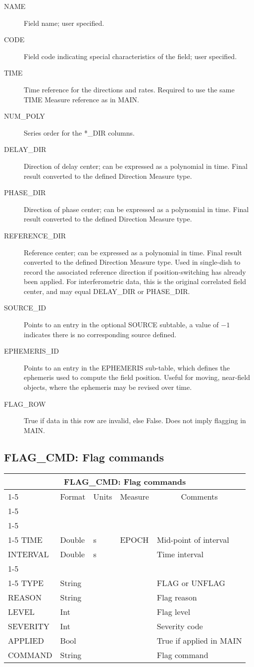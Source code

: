 \documentclass{article}
\newcommand{\defline}[1]{\cline{1-5}
\multicolumn{5}{|l|}{#1} \\
\cline{1-5}}
\newcommand{\definetable}[2]
{
	\vfill\newpage
	\subsection{#1}
        \vspace{0.15in}
        \small
	\begin{tabular}{|l|p{1.25in}|l|p{.9in}|p{1.4in}|}
	\hline
	\multicolumn{5}{|c|}{\bf #1}\\ 
	\cline{1-5}
        \multicolumn{1}{|c|}{Name}&\multicolumn{1}{|c|}{Format}&
        \multicolumn{1}{|c|}{Units}&\multicolumn{1}{|c|}{Measure}&
        \multicolumn{1}{|c|}{Comments}\\
        \cline{1-5}
        #2
        \hline
	\end{tabular}
}
\begin{document}
\begin{itemize}
\begin{description}
\item[NAME] Field name; user specified.

\item[CODE] Field code indicating special characteristics of the
field; user specified.

\item[TIME] Time reference for the directions and rates. Required to 
use the same TIME Measure reference as in MAIN.

\item[NUM\_POLY] Series order for the *\_DIR columns.

\item[DELAY\_DIR] Direction of delay center; can be expressed as a
polynomial in time. Final result converted to the defined Direction
Measure type.

\item[PHASE\_DIR] Direction of phase center; can be expressed as a
polynomial in time. Final result converted to the defined Direction
Measure type.

\item[REFERENCE\_DIR] Reference center; can be expressed as a
polynomial in time. Final result converted to the defined Direction
Measure type. Used in single-dish to record the associated reference
direction if position-switching has already been applied. For
interferometric data, this is the original correlated field center,
and may equal DELAY\_DIR or PHASE\_DIR.

\item[SOURCE\_ID] Points to an entry in the optional SOURCE subtable, a
value of $-1$ indicates there is no corresponding source defined.

\item[EPHEMERIS\_ID] Points to an entry in the EPHEMERIS sub-table,
which defines the ephemeris used to compute the field position. Useful
for moving, near-field objects, where the ephemeris may be revised over time.

\item[FLAG\_ROW] True if data in this row are invalid, else False. Does not
imply flagging in MAIN.

\end{description}

\definetable{FLAG\_CMD: Flag commands}{
\defline{\bf Columns}
\defline{\em Key}
TIME      &    Double   &   s  &  EPOCH & Mid-point of interval \\
INTERVAL  &    Double   &   s  &        & Time interval \\
\defline{\em Data}  
TYPE      &    String   &      &        & FLAG or UNFLAG\\
REASON    &    String   &      &        & Flag reason\\
LEVEL     &    Int      &      &        & Flag level\\
SEVERITY  &    Int      &      &        & Severity code\\
APPLIED   &    Bool     &      &        & True if applied in MAIN\\
COMMAND   & String  &      &        & Flag command\\
}
\begin{description}


\end{description}
\end{itemize}
\end{document}

